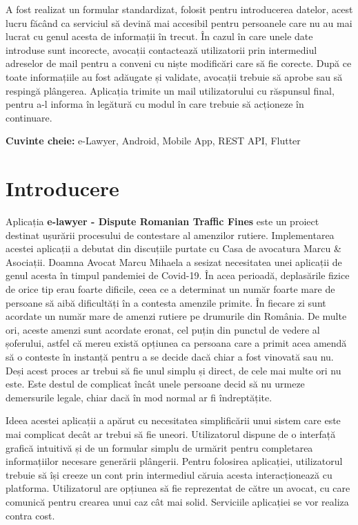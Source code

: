 \documentclass[12pt,a4paper]{report}
\theoremstyle{definition}
\theoremstyle{remark}
\begin{document}
A fost realizat un formular standardizat, folosit pentru introducerea datelor, acest lucru făcând ca serviciul să devină mai accesibil pentru persoanele care nu au mai lucrat cu genul acesta de informații în trecut. În cazul în care unele date introduse sunt incorecte, avocații contactează utilizatorii prin intermediul adreselor de mail pentru a conveni cu niște modificări care să fie corecte. După ce toate informațiile au fost adăugate și validate, avocații trebuie să aprobe sau să respingă plângerea. Aplicația trimite un mail utilizatorului cu răspunsul final, pentru a-l informa în legătură cu modul în care trebuie să acționeze în continuare.

\textbf{Cuvinte cheie:} e-Lawyer, Android, Mobile App, REST API, Flutter

\newpage
\tableofcontents
\newpage
\chapter{Introducere}

Aplicația \textbf{e-lawyer - Dispute Romanian Traffic Fines} este un proiect destinat ușurării procesului de contestare al amenzilor rutiere.  Implementarea acestei aplicații a debutat din discuțiile purtate cu Casa de avocatura Marcu \& Asociații. Doamna Avocat Marcu Mihaela a sesizat necesitatea unei aplicații de genul acesta în timpul pandemiei de Covid-19. În acea perioadă, deplasările fizice de orice tip erau foarte dificile, ceea ce a determinat un număr foarte mare de persoane să aibă dificultăți în a contesta amenzile primite. În fiecare zi sunt acordate un număr mare de amenzi rutiere pe drumurile din România. De multe ori, aceste amenzi sunt acordate eronat, cel puțin din punctul de vedere al șoferului, astfel că mereu există opțiunea ca persoana care a primit acea amendă să o conteste în instanță pentru a se decide dacă chiar a fost vinovată sau nu. Deși acest proces ar trebui să fie unul simplu și direct, de cele mai multe ori nu este. Este destul de complicat încât unele persoane decid să nu urmeze demersurile legale, chiar dacă în mod normal ar fi îndreptățite.

Ideea acestei aplicații a apărut cu necesitatea simplificării unui sistem care este mai complicat decât ar trebui să fie uneori. Utilizatorul dispune de o interfață grafică intuitivă și de un formular simplu de urmărit pentru completarea informațiilor necesare generării plângerii. Pentru folosirea aplicației, utilizatorul trebuie să își creeze un cont prin intermediul căruia acesta interacționează cu platforma. 
Utilizatorul are opțiunea să fie reprezentat de către un avocat, cu care comunică pentru crearea unui caz cât mai solid. Serviciile aplicației se vor realiza contra cost.
\end{document}
